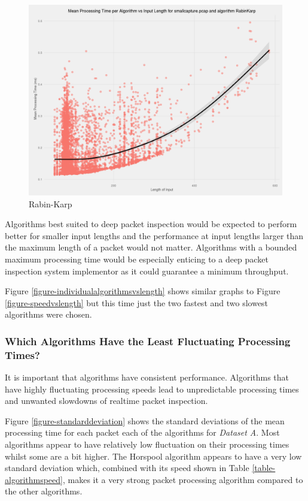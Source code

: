 \documentclass[9pt, conference]{IEEEtran}
\begin{document}
\begin{figure}[!hbt]
  \centering
  \includegraphics[width=\columnwidth]{images/scatter_mean_vs_input_length_RabinKarp}
  \caption{Rabin-Karp}
\end{figure}

Algorithms best suited to deep packet inspection would be expected to perform better for smaller input lengths and the performance at input lengths larger than the maximum length of a packet would not matter. Algorithms with a bounded maximum processing time would be especially enticing to a deep packet inspection system implementor as it could guarantee a minimum throughput. 

Figure \ref{figure-individualalgorithmsvslength} shows similar graphs to Figure \ref{figure-speedvslength} but this time just the two fastest and two slowest algorithms were chosen.

\subsubsection{Which Algorithms Have the Least Fluctuating Processing Times?}

It is important that algorithms have consistent performance. Algorithms that have highly fluctuating processing speeds lead to unpredictable processing times and unwanted slowdowns of realtime packet inspection.

Figure \ref{figure-standarddeviation} shows the standard deviations of the mean processing time for each packet each of the algorithms for \textit{Dataset A}. Most algorithms appear to have relatively low fluctuation on their processing times whilst some are a bit higher. The Horspool \citep{horspool1980} algorithm appears to have a very low standard deviation which, combined with its speed shown in Table \ref{table-algorithmspeed}, makes it a very strong packet processing algorithm compared to the other algorithms.
\end{document}
